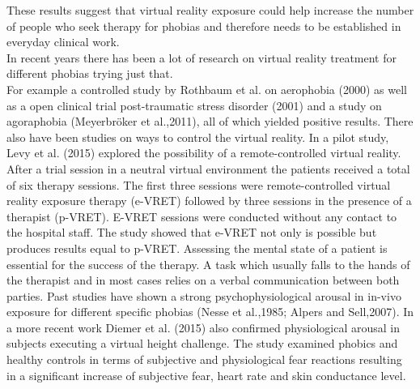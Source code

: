 These results suggest that virtual reality exposure could help increase the number of people who seek therapy for phobias and therefore needs to be established in everyday clinical work.\\
In recent years there has been a lot of research on virtual reality treatment for different phobias trying just that.\\
For example a controlled study by Rothbaum et al. on aerophobia (2000) as well as a open clinical trial post-traumatic stress disorder (2001) and a study on agoraphobia (Meyerbröker et al.,2011), all of which yielded positive results.
There also have been studies on ways to control the virtual reality. In a pilot study, Levy et al. (2015) explored the possibility of a remote-controlled virtual reality. After a trial session in a neutral virtual environment the patients received a total of six therapy sessions. The first three sessions were remote-controlled virtual reality exposure therapy (e-VRET) followed by three sessions in the presence of a therapist (p-VRET). E-VRET sessions were conducted without any contact to the hospital staff. The study showed that e-VRET not only is possible but produces results equal to p-VRET. %
Assessing the mental state of a patient is essential for the success of the therapy. A task which usually falls to the hands of the therapist and in most cases relies on a verbal communication between both parties.
Past studies have shown a strong psychophysiological arousal in in-vivo exposure for different specific phobias (Nesse et al.,1985; Alpers and Sell,2007). In a more recent work Diemer et al. (2015) also confirmed physiological arousal in subjects executing a virtual height challenge. The study examined phobics and healthy controls in terms of subjective and physiological fear reactions resulting in a significant increase of subjective fear, heart rate and skin conductance level. 
